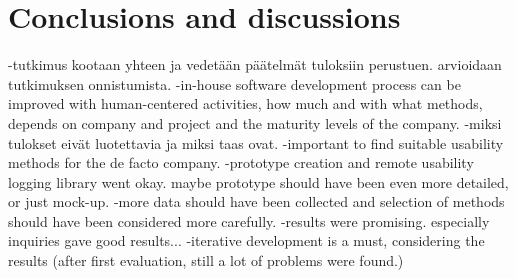 \documentclass[12pt,a4paper,oneside,pdftex]{report}
\begin{document}




% 


% 










% 

\chapter{Conclusions and discussions}
\label{chapter:conclusion}
-tutkimus kootaan yhteen ja vedetään päätelmät tuloksiin perustuen. 
arvioidaan tutkimuksen onnistumista.
-in-house software development process  can be improved with human-centered activities, how much and with what methods, depends on company and project and the maturity levels of the company.
-miksi tulokset eivät luotettavia ja miksi taas ovat.
-important to find suitable usability methods for the de facto company.
-prototype creation and remote usability logging library went okay. maybe prototype should have been even more detailed, or just mock-up.
-more data should have been collected and selection of methods should have been considered more carefully.
-results were promising. especially inquiries gave good results... 
-iterative development is a must, considering the results (after first evaluation, still a lot of problems were found.)
\end{document}
